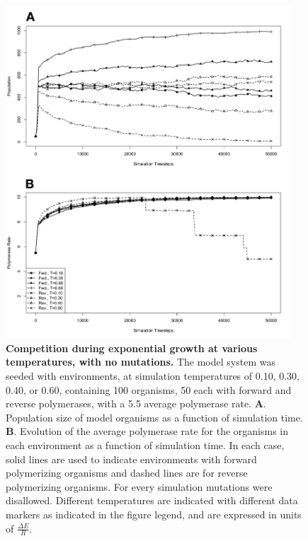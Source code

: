 \begin{figure}[!ht]
	\begin{center}
		\includegraphics[width=0.95\textwidth]{growth_compet_nomut}
	\end{center}
	\caption{
		{\bf Competition during exponential growth at various temperatures, with no mutations.}  The model system was seeded with environments, at simulation temperatures of 0.10, 0.30, 0.40, or 0.60, containing 100 organisms, 50 each with forward and reverse polymerases, with a 5.5 average polymerase rate. \textbf{A}. Population size of model organisms as a function of simulation time. \textbf{B}. Evolution of the average polymerase rate for the organisms in each environment as a function of simulation time. In each case, solid lines are used to indicate environments with forward polymerizing organisms and dashed lines are for reverse polymerizing organisms. For every simulation mutations were disallowed. Different temperatures are indicated with different data markers as indicated in the figure legend, and are expressed in units of $\frac{\Delta E}{R}$.
		}
		\label{fig:growth_compet_nomut}
\end{figure}

